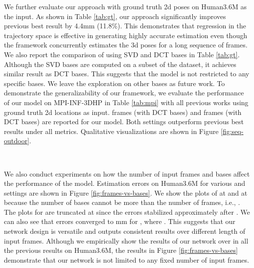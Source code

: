 \documentclass{bmvc2k}
\begin{document}
We further evaluate our approach with ground truth 2d poses on Human3.6M as the input. As shown in Table \ref{tab:gt}, our approach significantly improves previous best result by 4.4mm (11.8\%). This demonstrates that regression in the trajectory space is effective in generating highly accurate estimation even though the framework concurrently estimates the 3d poses for a long sequence of frames.
We also report the comparison of using SVD and DCT bases in Table \ref{tab:gt}. Although the SVD bases are computed on a subset of the dataset, it achieves similar result as DCT bases. This suggests that the model is not restricted to any specific bases. We leave the exploration on other bases as future work.
To demonstrate the generalizability of our framework, we evaluate the performance of our model on MPI-INF-3DHP in Table \ref{tab:mpi} with all previous works using ground truth 2d locations as input.  frames (with  DCT bases) and  frames (with  DCT bases) are reported for our model. Both settings outperform previous best results under all metrics. Qualitative visualizations are shown in Figure \ref{fig:seq-outdoor}.

\begin{figure*}[t]
\caption{\textbf{(a)}: Average per frame error within a sequence of different sequence lengths. \textbf{(b)}: Estimation error on Human3.6M for different numbers of frames and bases.}
\end{figure*}

\begin{figure*}[t]
\\
\caption{Qualitative results for both indoor and outdoor videos. First row are 2d inputs. Second row are estimated 3d poses. Third row are ground truth 3d poses.}
\label{fig:seq-outdoor}
\end{figure*}

We also conduct experiments on how the number of input frames  and bases  affect the performance of the model. Estimation errors on Human3.6M for various  and  settings are shown in Figure \ref{fig:frames-vs-bases}.
We show the plots of  at  and  at  because the number of bases cannot be more than the number of frames, i.e., . The plots for  are truncated at  since the errors stabilized approximately after . We can also see that errors converged to mm for , where . This suggests that our network design is versatile and outputs consistent results over different length of input frames.
Although we empirically show the results of our network over  in all the previous results on Human3.6M, the results in Figure \ref{fig:frames-vs-bases} demonstrate that our network is not limited to any fixed number of input frames.
\end{document}
